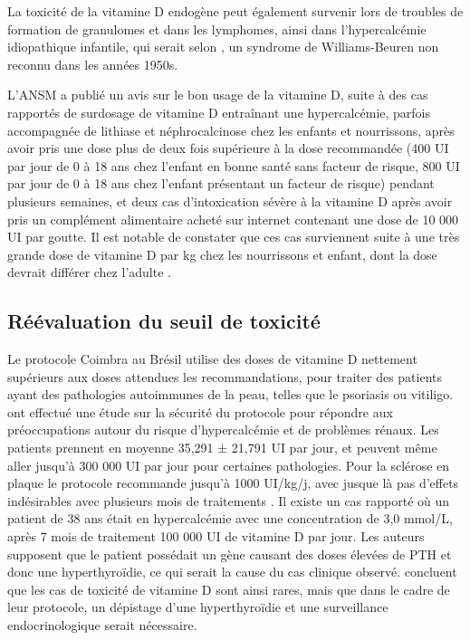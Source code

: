 \documentclass[
  a4paper,
  DIV=11,
  numbers=noendperiod,
  listof=totoc]{scrreprt}
\begin{document}
La toxicité de la vitamine D endogène peut également survenir lors de
troubles de formation de granulomes et dans les lymphomes, ainsi dans
l'hypercalcémie idiopathique infantile, qui serait selon
\textcite{Holick.2015}, un syndrome de Williams-Beuren non reconnu dans
les années 1950s.

L'ANSM a publié un avis sur le bon usage de la vitamine D, suite à des
cas rapportés de surdosage de vitamine D entraînant une hypercalcémie,
parfois accompagnée de lithiase et néphrocalcinose chez les enfants et
nourrissons, après avoir pris une dose plus de deux fois supérieure à la
dose recommandée (400 UI par jour de 0 à 18 ans chez l'enfant en bonne
santé sans facteur de risque, 800 UI par jour de 0 à 18 ans chez
l'enfant présentant un facteur de risque) pendant plusieurs semaines, et
deux cas d'intoxication sévère à la vitamine D après avoir pris un
complément alimentaire acheté sur internet contenant une dose de 10 000
UI par goutte. Il est notable de constater que ces cas surviennent suite
à une très grande dose de vitamine D par kg chez les nourrissons et
enfant, dont la dose devrait différer chez l'adulte
\autocite{ANSM.2021}.

\hypertarget{ruxe9uxe9valuation-du-seuil-de-toxicituxe9}{%
\subsection{Réévaluation du seuil de
toxicité}\label{ruxe9uxe9valuation-du-seuil-de-toxicituxe9}}

Le protocole Coimbra au Brésil utilise des doses de vitamine D nettement
supérieurs aux doses attendues les recommandations, pour traiter des
patients ayant des pathologies autoimmunes de la peau, telles que le
psoriasis ou vitiligo. \textcite{Amon.2022} ont effectué une étude sur
la sécurité du protocole pour répondre aux préoccupations autour du
risque d'hypercalcémie et de problèmes rénaux. Les patients prennent en
moyenne 35,291 ± 21,791 UI par jour, et peuvent même aller jusqu'à 300
000 UI par jour pour certaines pathologies. Pour la sclérose en plaque
le protocole recommande jusqu'à 1000 UI/kg/j, avec jusque là pas
d'effets indésirables avec plusieurs mois de traitements
\textcite{Lemke.2021}. Il existe un cas rapporté où un patient de 38 ans
était en hypercalcémie avec une concentration de 3,0 mmol/L, après 7
mois de traitement 100 000 UI de vitamine D par jour. Les auteurs
supposent que le patient possédait un gène causant des doses élevées de
PTH et donc une hyperthyroïdie, ce qui serait la cause du cas clinique
observé. \textcite{Lemke.2021} concluent que les cas de toxicité de
vitamine D sont ainsi rares, mais que dans le cadre de leur protocole,
un dépistage d'une hyperthyroïdie et une surveillance endocrinologique
serait nécessaire.
\end{document}
